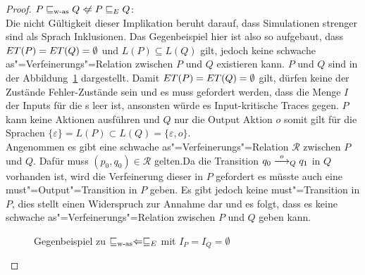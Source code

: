 \begin{proof}
  $P\wasRel Q\hspace{0.1cm}\not\hspace{-0.1cm}\Leftarrow P\ERel Q$:\\
  Die nicht Gültigkeit dieser Implikation beruht darauf, dass Simulationen
  strenger sind als Sprach Inklusionen. Das Gegenbeispiel hier ist also so
  aufgebaut, dass $ET (P) =ET (Q) = \emptyset$ und $L(P) \subseteq L(Q)$
  gilt, jedoch keine schwache as"=Verfeinerungs"=Relation zwischen $P$ und $Q$
  existieren kann. $P$ und $Q$ sind in der Abbildung~\ref{WasEGegenBsp}
  dargestellt. Damit $ET (P) =ET (Q) = \emptyset$ gilt, dürfen keine der
  Zustände Fehler-Zustände sein und es muss gefordert werden, dass die Menge
  $I$ der Inputs für die \MEIO{}s leer ist, ansonsten würde es Input-kritische
  Traces gegen. $P$ kann keine Aktionen ausführen und $Q$ nur die Output Aktion
  $o$ somit gilt für die Sprachen $\{\varepsilon\} = L(P) \subset L(Q) =
  \{\varepsilon , o\}$.\\
  Angenommen es gibt eine schwache as"=Verfeinerungs"=Relation $\mathcal{R}$
  zwischen $P$ und $Q$. Dafür muss $(p_0,q_0)\in \mathcal{R}$ gelten.Da die
  Transition $q_0 \must[o]_Q q_1$ in $Q$ vorhanden ist, wird die Verfeinerung
  dieser in $P$ gefordert es müsste auch eine must"=Output"=Transition in $P$
  geben. Es gibt jedoch keine must"=Transition in $P$, dies stellt einen
  Widerspruch zur Annahme dar und es folgt, dass es keine schwache
  as"=Verfeinerungs"=Relation zwischen $P$ und $Q$ geben kann.

  \begin{figure}[htbp]
    \begin{center}
      \caption{Gegenbeispiel zu $\sqsubseteq _{\mathrm{w}\text{-}\mathrm{as}} \Leftarrow  \sqsubseteq  _E$ mit $I_P = I_Q =
      \emptyset$}
      \label{WasEGegenBsp}
    \end{center}
  \end{figure}
\end{proof}

